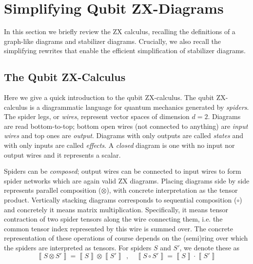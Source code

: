 \section{Simplifying Qubit ZX-Diagrams}

In this section we briefly review the ZX calculus, recalling the definitions of a graph-like diagrams and stabilizer diagrams.
Crucially, we also recall the simplifying rewrites that enable the efficient
simplification of stabilizer diagrams.

\subsection{The Qubit ZX-Calculus}

Here we give a quick introduction to the qubit ZX-calculus.
The qubit ZX-calculus is a diagrammatic language for quantum mechanics generated by \emph{spiders}.
The spider legs, or \emph{wires}, represent vector spaces of dimension $d=2$.
Diagrams are read bottom-to-top; bottom open wires (not connected to anything) are \emph{input wires} and top ones are \emph{output}.
Diagrams with only outputs are called \emph{states} and with only inputs are called \emph{effects}.
A \emph{closed} diagram is one with no input nor output wires
and it represents a scalar.

Spiders can be \emph{composed};
output wires can be connected to input wires
to form spider networks which are again valid ZX diagrams.
Placing diagrams side by side represents parallel composition ($\otimes$),
with concrete interpretation as the tensor product.
Vertically stacking diagrams corresponds to sequential composition ($\circ$) and concretely it means matrix multiplication.
Specifically, it means tensor contraction of two spider tensors along the wire connecting them, i.e. the common tensor index represented by this wire is summed over.
The concrete representation of these operations of course depends on the (semi)ring over which the spiders are interpreted as tensors.
For spiders $S$ and $S'$, we denote these as
\begin{equation}
\left\llbracket S \otimes S' \right\rrbracket = \left\llbracket S \right\rrbracket \otimes \left\llbracket S' \right\rrbracket ~~,\quad
	\left\llbracket S \circ S' \right\rrbracket = \left\llbracket S \right\rrbracket \cdot \left\llbracket S' \right\rrbracket 
\end{equation} 


